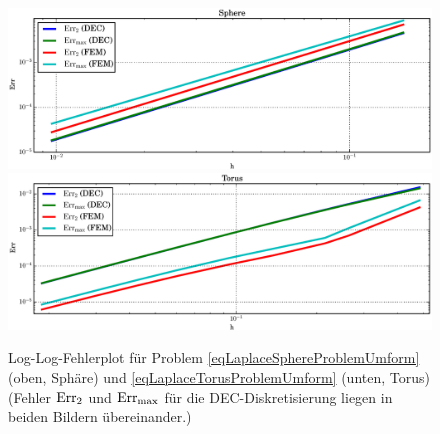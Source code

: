     \begin{figure}
      \centering\includegraphics[width=\textwidth]{bilder/laplaceSphere/errplot.eps}
      \centering\includegraphics[width=\textwidth]{bilder/laplaceTorus/errplot.eps}
      \caption[Fehlerplot (Laplace auf Sphäre/Torus)]
              {Log-Log-Fehlerplot für Problem \eqref{eqLaplaceSphereProblemUmform} (oben, Sphäre)
               und \eqref{eqLaplaceTorusProblemUmform} (unten, Torus)
               (Fehler \( \text{Err}_{2} \) und \( \text{Err}_{\max} \) für die DEC-Diskretisierung liegen 
                in beiden Bildern übereinander.)}
      \label{figFehlerPlotLaplace}
    \end{figure}
